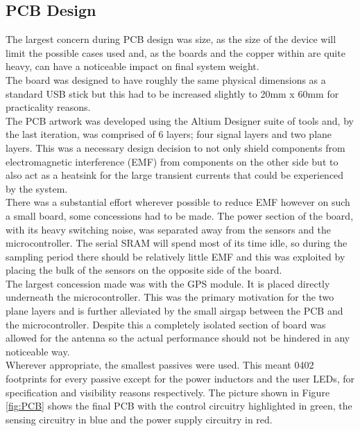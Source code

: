 \documentclass[12pt,openany,a4paper]{book}
\begin{document}
		\subsection{PCB Design}
			The largest concern during PCB design was size, as the size of the device will limit the possible cases used and, as the boards and the copper within are quite heavy, can have a noticeable impact on final system weight. \\
			
			The board was designed to have roughly the same physical dimensions as a standard USB stick but this had to be increased slightly to 20mm x 60mm for practicality reasons. \\
			
			The PCB artwork was developed using the Altium Designer suite of tools and, by the last iteration, was comprised of 6 layers; four signal layers and two plane layers. This was a necessary design decision to not only shield components from electromagnetic interference (EMF) from components on the other side but to also act as a heatsink for the large transient currents that could be experienced by the system. \\
			
			There was a substantial effort wherever possible to reduce EMF however on such a small board, some concessions had to be made. The power section of the board, with its heavy switching noise, was separated away from the sensors and the microcontroller. The serial SRAM will spend most of its time idle, so during the sampling period there should be relatively little EMF and this was exploited by placing the bulk of the sensors on the opposite side of the board. \\
			
			The largest concession made was with the GPS module. It is placed directly underneath the microcontroller. This was the primary motivation for the two plane layers and is further alleviated by the small airgap between the PCB and the microcontroller. Despite this a completely isolated section of board was allowed for the antenna so the actual performance should not be hindered in any noticeable way. \\
			
			Wherever appropriate, the smallest passives were used. This meant 0402 footprints for every passive except for the power inductors and the user LEDs, for specification and visibility reasons respectively. The picture shown in Figure \ref{fig:PCB} shows the final PCB with the control circuitry highlighted in green, the sensing circuitry in blue and the power supply circuitry in red. \\
\end{document}
